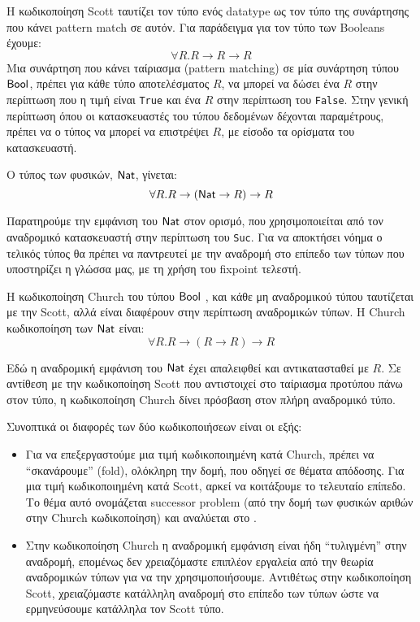 Η κωδικοποίηση Scott ταυτίζει τον τύπο ενός datatype ως τον τύπο της συνάρτησης που κάνει
pattern match σε αυτόν. Για παράδειγμα για τον τύπο των Booleans έχουμε:
\begin{displaymath}
  \forall R . R \rightarrow R \rightarrow R
\end{displaymath}
Μια συνάρτηση που κάνει ταίριασμα (pattern matching) σε μία συνάρτηση τύπου
$\operatorname{\textsf{Bool}}$, πρέπει για κάθε τύπο αποτελέσματος $R$,
να μπορεί να δώσει ένα $R$ στην περίπτωση που η τιμή είναι \texttt{True}
και ένα $R$ στην περίπτωση του \texttt{False}. Στην γενική περίπτωση όπου οι
κατασκευαστές του τύπου
δεδομένων δέχονται παραμέτρους, πρέπει να ο τύπος να μπορεί να επιστρέψει $R$,
με είσοδο τα ορίσματα του κατασκευαστή.

Ο τύπος των φυσικών, $\operatorname{\textsf{Nat}}$, γίνεται:
\begin{displaymath}
  \forall R . R \rightarrow (\operatorname{\textsf{Nat}} \rightarrow R) \rightarrow R
  \end{displaymath}

Παρατηρούμε την εμφάνιση του $\operatorname{\textsf{Nat}}$ στον ορισμό, που χρησιμοποιείται από
τον αναδρομικό κατασκευαστή στην περίπτωση του \texttt{Suc}. Για να αποκτήσει
νόημα ο τελικός τύπος θα πρέπει να παντρευτεί με την αναδρομή στο επίπεδο
των τύπων που υποστηρίζει η γλώσσα μας, με τη χρήση του fixpoint τελεστή.

Η κωδικοποίηση Church του τύπου $\operatorname{\textsf{Bool}}$ , και κάθε μη αναδρομικού τύπου
ταυτίζεται με την Scott, αλλά είναι διαφέρουν στην περίπτωση αναδρομικών τύπων.
Η Church κωδικοποίηση των $\operatorname{\textsf{Nat}}$ είναι:
\begin{displaymath}
  \forall R . R \rightarrow (R \rightarrow R) \rightarrow R
  \end{displaymath}

Εδώ η αναδρομική εμφάνιση του $\operatorname{\textsf{Nat}}$ έχει απαλειφθεί και αντικατασταθεί
με $R$. Σε αντίθεση με την κωδικοποίηση Scott που αντιστοιχεί στο ταίριασμα
προτύπου πάνω στον τύπο, η κωδικοποίηση Church δίνει πρόσβαση στον πλήρη
αναδρομικό τύπο.

Συνοπτικά οι διαφορές των δύο κωδικοποιήσεων είναι οι εξής:
\begin{itemize}
\item Για να επεξεργαστούμε μια τιμή κωδικοποιημένη κατά Church, πρέπει
να ``σκανάρουμε'' (fold), ολόκληρη την δομή, που οδηγεί σε θέματα απόδοσης.
Για μια τιμή κωδικοποιημένη κατά Scott, αρκεί να κοιτάξουμε το τελευταίο
επίπεδο. Το θέμα αυτό ονομάζεται successor problem (από την δομή των φυσικών
αριθών στην Church κωδικοποίηση) και αναλύεται στο  \cite{scott}.

\item  Στην κωδικοποίηση Church η αναδρομική εμφάνιση είναι ήδη ``τυλιγμένη''
στην αναδρομή, επομένως δεν χρειαζόμαστε επιπλέον εργαλεία από την θεωρία
αναδρομικών τύπων για να την χρησιμοποιήσουμε. Αντιθέτως στην κωδικοποίηση
Scott, χρειαζόμαστε κατάλληλη αναδρομή στο επίπεδο των τύπων ώστε να
ερμηνεύσουμε κατάλληλα τον Scott τύπο.

\end{itemize}
